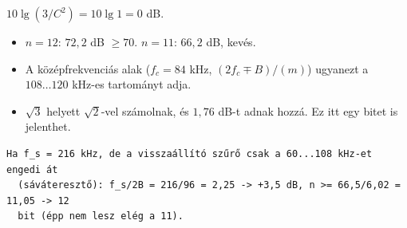 $10\lg(3/C^2)=10\lg1=0$ dB.

\begin{center}\end{center}

\begin{center}\end{center}

\begin{center}\end{center}
\begin{eredmeny}

\begin{center}\end{center}
\end{eredmeny}
\begin{tipp}[Ellenőrzés]
\begin{itemize}
\item $n=12$: $72{,}2$ dB $\ge70$. $n=11$: $66{,}2$ dB, kevés.
\item A középfrekvenciás alak ($f_c=84$ kHz, $(2f_c\mp B)/(m)$) ugyanezt a $108\ldots120$ kHz-es tartományt adja.
\end{itemize}
\end{tipp}
\begin{figyelem}
\begin{itemize}
\item $\sqrt3$ helyett $\sqrt2$-vel számolnak, és $1{,}76$ dB-t adnak hozzá. Ez itt egy bitet is jelenthet.
\end{itemize}
\end{figyelem}
\begin{tipp}
\small
\begin{verbatim}
Ha f_s = 216 kHz, de a visszaállító szűrő csak a 60...108 kHz-et engedi át
  (sáváteresztő): f_s/2B = 216/96 = 2,25 -> +3,5 dB, n >= 66,5/6,02 = 11,05 -> 12
  bit (épp nem lesz elég a 11).
\end{verbatim}
\end{tipp}


